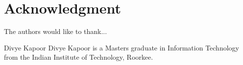 \documentclass[10pt,journal,letterpaper,compsoc]{IEEEtran}
\begin{document}
  \section*{Acknowledgment}
\fi


The authors would like to thank...


\ifCLASSOPTIONcaptionsoff
  \newpage
\fi







%
%
%

% 

\begin{IEEEbiography}{Divye Kapoor}
Divye Kapoor is a Masters graduate in Information Technology from the 
Indian Institute of Technology, Roorkee. 
\end{IEEEbiography}
\end{document}
